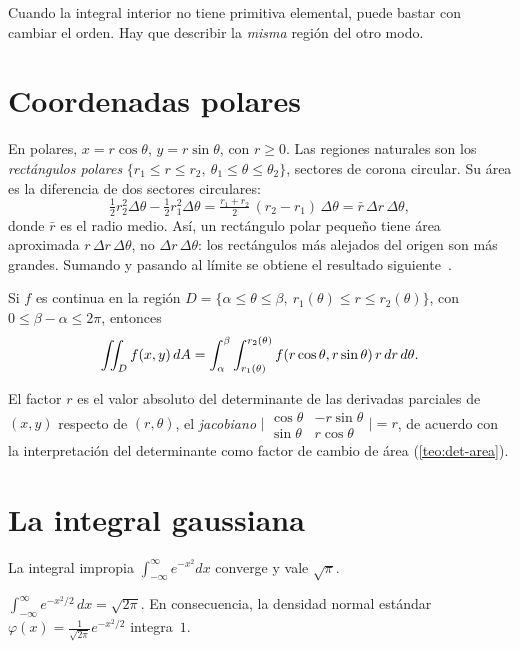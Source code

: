 \addtocounter{definicion}{1}%

Cuando la integral interior no tiene primitiva elemental, puede bastar con cambiar el orden. Hay que describir la \emph{misma} región del otro modo.

\addtocounter{definicion}{1}%

\section{Coordenadas polares}

En polares, $x=r\cos\theta$, $y=r\sin\theta$, con $r\ge0$. Las regiones naturales son los \emph{rectángulos polares} $\{r_1\le r\le r_2,\ \theta_1\le\theta\le\theta_2\}$, sectores de corona circular. Su área es la diferencia de dos sectores circulares:
\[
\tfrac12r_2^2\Delta\theta-\tfrac12r_1^2\Delta\theta=\tfrac{r_1+r_2}{2}\,(r_2-r_1)\,\Delta\theta=\bar r\,\Delta r\,\Delta\theta ,
\]
donde $\bar r$ es el radio medio. Así, un rectángulo polar pequeño tiene área aproximada $r\,\Delta r\,\Delta\theta$, no $\Delta r\,\Delta\theta$: los rectángulos más alejados del origen son más grandes. Sumando y pasando al límite se obtiene el resultado siguiente~\cite[§11.26--11.31]{apostol2}.

\begin{teorema}\label{teo:polares}
Si $f$ es continua en la región $D=\{\alpha\le\theta\le\beta,\ r_1(\theta)\le r\le r_2(\theta)\}$, con $0\le\beta-\alpha\le2\pi$, entonces
\[
\iint_Df(x,y)\,dA=\int_\alpha^\beta\int_{r_1(\theta)}^{r_2(\theta)}f(r\cos\theta,r\sin\theta)\,r\,dr\,d\theta .
\]
\end{teorema}

El factor $r$ es el valor absoluto del determinante de las derivadas parciales de $(x,y)$ respecto de $(r,\theta)$, el \emph{jacobiano} $\bigl|\begin{smallmatrix}\cos\theta&-r\sin\theta\\\sin\theta&r\cos\theta\end{smallmatrix}\bigr|=r$, de acuerdo con la interpretación del determinante como factor de cambio de área (\cref{teo:det-area}).

\addtocounter{definicion}{1}%

\section{La integral gaussiana}

\begin{teorema}\label{teo:gauss}
La integral impropia $\int_{-\infty}^{\infty}e^{-x^2}dx$ converge y vale $\sqrt\pi$.
\end{teorema}

\addtocounter{figure}{1}%

\begin{corolario}\label{cor:gauss-normal}
$\displaystyle\int_{-\infty}^{\infty}e^{-x^2/2}\,dx=\sqrt{2\pi}$. En consecuencia, la densidad normal estándar $\varphi(x)=\frac{1}{\sqrt{2\pi}}e^{-x^2/2}$ integra~$1$.
\end{corolario}

\addtocounter{definicion}{1}%

\addtocounter{definicion}{1}%

